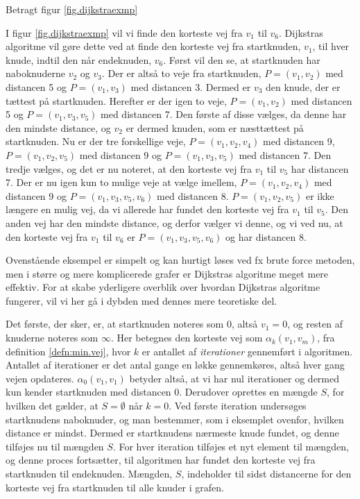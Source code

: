 \begin{exmp}
Betragt figur \ref{fig.dijkstraexmp}

I figur \ref{fig.dijkstraexmp} vil vi finde den korteste vej fra $v_{1}$ til $v_{6}$. Dijkstras algoritme vil gøre dette ved at finde den korteste vej fra startknuden, $v_{1}$, til hver knude, indtil den når endeknuden, $v_{6}$. Først vil den se, at startknuden har naboknuderne $v_{2}$ og $v_{3}$. Der er altså to veje fra startknuden, $P=(v_{1},v_{2})$ med distancen 5 og $P=(v_{1},v_{3})$ med distancen 3. Dermed er $v_{3}$ den knude, der er tættest på startknuden. Herefter er der igen to veje, $P=(v_{1},v_{2})$ med distancen 5 og $P=(v_{1},v_{3},v_{5})$ med distancen 7. Den første af disse vælges, da denne har den mindste distance, og $v_{2}$ er dermed knuden, som er næsttættest på startknuden. Nu er der tre forskellige veje, $P=(v_{1},v_{2}, v_{4})$ med distancen 9, $P=(v_{1},v_{2}, v_{5})$ med distancen 9 og $P=(v_{1},v_{3}, v_{5})$ med distancen 7. Den tredje vælges, og det er nu noteret, at den korteste vej fra $v_{1}$ til $v_{5}$ har distancen 7. Der er nu igen kun to mulige veje at vælge imellem, $P=(v_{1},v_{2}, v_{4})$ med distancen 9 og $P=(v_{1},v_{3}, v_{5}, v_{6})$ med distancen 8. $P=(v_{1},v_{2}, v_{5})$ er ikke længere en mulig vej, da vi allerede har fundet den korteste vej fra $v_{1}$ til $v_{5}$. Den anden vej har den mindste distance, og derfor vælger vi denne, og vi ved nu, at den korteste vej fra $v_{1}$ til $v_{6}$ er $P=(v_{1},v_{3}, v_{5}, v_{6})$ og har distancen 8.
\end{exmp}
Ovenstående eksempel er simpelt og kan hurtigt løses ved fx brute force metoden, men i større og mere komplicerede grafer er Dijkstras algoritme meget mere effektiv. For at skabe yderligere overblik over hvordan Dijkstras algoritme fungerer, vil vi her gå i dybden med dennes mere teoretiske del.

Det første, der sker, er, at startknuden noteres som $0$, altså $v_{1} = 0$, og resten af knuderne noteres som $\infty$. Her betegnes den korteste vej som $\alpha_{k}(v_1,v_m)$, fra definition \ref{defn:min.vej}, hvor $k$ er antallet af \emph{iterationer} gennemført i algoritmen. Antallet af iterationer er det antal gange en løkke gennemkøres, altså hver gang vejen opdateres.  $\alpha_{0}(v_1,v_1)$ betyder altså, at vi har nul iterationer og dermed kun kender startknuden med distancen 0. Derudover oprettes en mængde $S$, for hvilken det gælder, at $S = \emptyset$ når $k = 0$. Ved første iteration undersøges startknudens naboknuder, og man bestemmer, som i eksemplet ovenfor, hvilken distance er mindst. Dermed er startknudens nærmeste knude fundet, og denne tilføjes nu til mængden $S$. For hver iteration tilføjes et nyt element til mængden, og denne proces fortsætter, til algoritmen har fundet den korteste vej fra startknuden til endeknuden. Mængden, $S$, indeholder til sidst distancerne for den korteste vej fra startknuden til alle knuder i grafen. 


